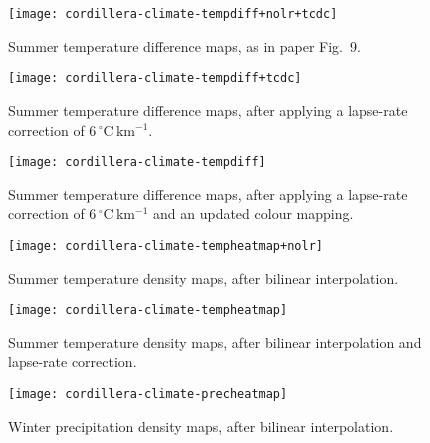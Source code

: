 \documentclass[10pt]{article}
\begin{document}

\clearpage

\begin{figure}
    \centering
    \texttt{[image: cordillera-climate-tempdiff+nolr+tcdc]}
    \caption{Summer temperature difference maps, as in paper Fig.~9.}
\end{figure}

\begin{figure}
    \centering
    \texttt{[image: cordillera-climate-tempdiff+tcdc]}
    \caption{Summer temperature difference maps, after applying a lapse-rate correction of 6\,{$^\circ$}C\,km$^{-1}$.}
\end{figure}

\begin{figure}
    \centering
    \texttt{[image: cordillera-climate-tempdiff]}
    \caption{Summer temperature difference maps, after applying a lapse-rate correction of 6\,{$^\circ$}C\,km$^{-1}$ and an updated colour mapping.}
\end{figure}

\begin{figure}
    \centering
    \texttt{[image: cordillera-climate-tempheatmap+nolr]}
    \caption{Summer temperature density maps, after bilinear interpolation.}
\end{figure}

\begin{figure}
    \centering
    \texttt{[image: cordillera-climate-tempheatmap]}
    \caption{Summer temperature density maps, after bilinear interpolation and lapse-rate correction.}
\end{figure}

\begin{figure}
    \centering
    \texttt{[image: cordillera-climate-precheatmap]}
    \caption{Winter precipitation density maps, after bilinear interpolation.}
\end{figure}
\end{document}
